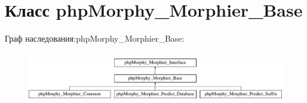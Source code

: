 \hypertarget{classphpMorphy__Morphier__Base}{
\section{Класс phpMorphy\_\-Morphier\_\-Base}
\label{classphpMorphy__Morphier__Base}
}
Граф наследования:phpMorphy\_\-Morphier\_\-Base:\begin{figure}[H]
\begin{center}
\leavevmode
\includegraphics[height=2.231076cm]{classphpMorphy__Morphier__Base}
\end{center}
\end{figure}
